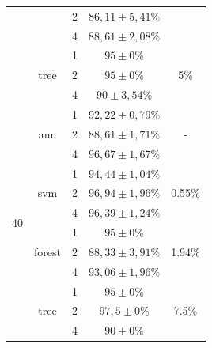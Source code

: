 \begin{table}[]
\begin{tabular}{|c|c|c|c|c|}
                      &                         & 2                & $ 86,11 \pm 5,41 \% $   &\\ \cline{3-4} 
                      &                         & 4                & $ 88,61 \pm 2,08 \% $  & \\ \cline{2-5} 
                      & \multirow{3}{*}{tree}   & 1                & $ 95 \pm 0 \%  $       & \multirow{3}{*}{5\%} \\ \cline{3-4} 
                      &                         & 2                & $ 95 \pm 0 \%  $       &\\ \cline{3-4} 
                      &                         & 4                & $ 90 \pm  3,54 \% $     & \\ \hline
\multirow{12}{*}{40}  & \multirow{3}{*}{ann}    & 1                & $ 92,22 \pm 0,79 \% $   & \multirow{3}{*}{-} \\ \cline{3-4} 
                      &                         & 2                & $ 88,61 \pm 1,71 \% $   &\\ \cline{3-4} 
                      &                         & 4                & $ 96,67 \pm 1,67 \% $  & \\ \cline{2-5} 
                      & \multirow{3}{*}{svm}    & 1                & $ 94,44 \pm 1,04 \% $   & \multirow{3}{*}{0.55\%} \\ \cline{3-4} 
                      &                         & 2                & $ 96,94 \pm 1,96 \% $  & \\ \cline{3-4} 
                      &                         & 4                & $ 96,39 \pm 1,24 \% $   &\\ \cline{2-5} 
                      & \multirow{3}{*}{forest} & 1                & $ 95 \pm 0 \% $        & \multirow{3}{*}{1.94\%} \\ \cline{3-4} 
                      &                         & 2                & $ 88,33 \pm 3,91 \% $   &\\ \cline{3-4} 
                      &                         & 4                & $ 93,06 \pm 1,96 \% $   &\\ \cline{2-5} 
                      & \multirow{3}{*}{tree}   & 1                & $ 95 \pm 0 \% $         & \multirow{3}{*}{7.5\%} \\ \cline{3-4} 
                      &                         & 2                & $ 97,5 \pm 0 \% $      &\\ \cline{3-4} 
                      &                         & 4                & $ 90 \pm 0 \%   $     & \\ \hline

\end{tabular}
\end{table}
